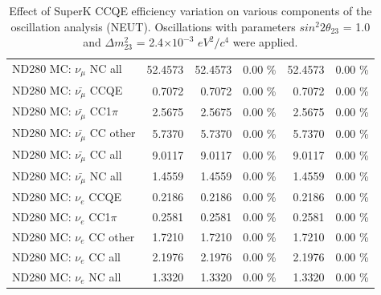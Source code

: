 \begin{table}
\begin{tabular}{| l | r | r  r | r  r |}
                                          ND280 MC: $\nu_{\mu}$ NC all &         52.4573 &         52.4573 &  0.00 \%  &         52.4573 &  0.00 \%  \\ 
                                      ND280 MC: $\bar{\nu_{\mu}}$ CCQE &          0.7072 &          0.7072 &  0.00 \%  &          0.7072 &  0.00 \%  \\ 
                                  ND280 MC: $\bar{\nu_{\mu}}$ CC1$\pi$ &          2.5675 &          2.5675 &  0.00 \%  &          2.5675 &  0.00 \%  \\ 
                                  ND280 MC: $\bar{\nu_{\mu}}$ CC other &          5.7370 &          5.7370 &  0.00 \%  &          5.7370 &  0.00 \%  \\ 
                                    ND280 MC: $\bar{\nu_{\mu}}$ CC all &          9.0117 &          9.0117 &  0.00 \%  &          9.0117 &  0.00 \%  \\ 
                                    ND280 MC: $\bar{\nu_{\mu}}$ NC all &          1.4559 &          1.4559 &  0.00 \%  &          1.4559 &  0.00 \%  \\ 
                                              ND280 MC: $\nu_{e}$ CCQE &          0.2186 &          0.2186 &  0.00 \%  &          0.2186 &  0.00 \%  \\ 
                                          ND280 MC: $\nu_{e}$ CC1$\pi$ &          0.2581 &          0.2581 &  0.00 \%  &          0.2581 &  0.00 \%  \\ 
                                          ND280 MC: $\nu_{e}$ CC other &          1.7210 &          1.7210 &  0.00 \%  &          1.7210 &  0.00 \%  \\ 
                                            ND280 MC: $\nu_{e}$ CC all &          2.1976 &          2.1976 &  0.00 \%  &          2.1976 &  0.00 \%  \\ 
                                            ND280 MC: $\nu_{e}$ NC all &          1.3320 &          1.3320 &  0.00 \%  &          1.3320 &  0.00 \%  \\ 
\hline
\end{tabular}
\caption{
  Effect of SuperK CCQE efficiency variation 
  on various components of the oscillation analysis (NEUT).
  Oscillations with parameters $sin^{2}2\theta_{23}$ = 1.0 and $\Delta m^{2}_{23}$ = 2.4$\times10^{-3}$ $eV^{2}/c^{4}$ were applied.  
}
\label{tab:neut_sk_ccqe_eff}
\end{table}


%
%
%
%

